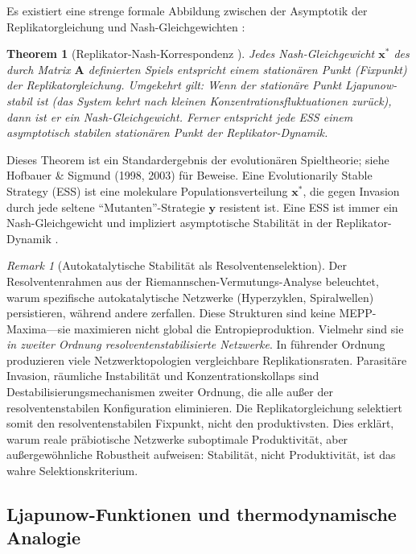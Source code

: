 \documentclass[12pt,a4paper]{article}
\newtheorem{theorem}{Theorem}
\theoremstyle{remark}
\newtheorem{remark}{Remark}
\begin{document}
Es existiert eine strenge formale Abbildung zwischen der Asymptotik der Replikatorgleichung und Nash-Gleichgewichten \citep{ReplicatorEntropy}:

\begin{theorem}[Replikator-Nash-Korrespondenz {\citep{HofbauerSigmund2003,HofbauerSigmund1998}}]
\label{thm:replicator-nash}
Jedes Nash-Gleichgewicht $\mathbf{x}^*$ des durch Matrix $\mathbf{A}$ definierten Spiels entspricht einem station\"aren Punkt (Fixpunkt) der Replikatorgleichung. Umgekehrt gilt: Wenn der station\"are Punkt Ljapunow-stabil ist (das System kehrt nach kleinen Konzentrationsfluktuationen zur\"uck), dann ist er ein Nash-Gleichgewicht. Ferner entspricht jede ESS einem asymptotisch stabilen station\"aren Punkt der Replikator-Dynamik.
\end{theorem}

Dieses Theorem ist ein Standardergebnis der evolution\"aren Spieltheorie; siehe Hofbauer \& Sigmund (1998, 2003) f\"ur Beweise. Eine Evolutionarily Stable Strategy (ESS) ist eine molekulare Populationsverteilung $\mathbf{x}^*$, die gegen Invasion durch jede seltene ``Mutanten''-Strategie $\mathbf{y}$ resistent ist. Eine ESS ist immer ein Nash-Gleichgewicht und impliziert asymptotische Stabilit\"at in der Replikator-Dynamik \citep{HofbauerSigmund1998}.

\begin{remark}[Autokatalytische Stabilit\"at als Resolventenselektion]
\label{rem:autocatalysis-resolvent}
Der Resolventenrahmen aus der Riemannschen-Vermutungs-Analyse \citep{GeigerRH2026b} beleuchtet, warum spezifische autokatalytische Netzwerke (Hyperzyklen, Spiralwellen) persistieren, w\"ahrend andere zerfallen. Diese Strukturen sind keine MEPP-Maxima---sie maximieren nicht global die Entropieproduktion. Vielmehr sind sie \emph{in zweiter Ordnung resolventenstabilisierte Netzwerke}. In f\"uhrender Ordnung produzieren viele Netzwerktopologien vergleichbare Replikationsraten. Parasit\"are Invasion, r\"aumliche Instabilit\"at und Konzentrationskollaps sind Destabilisierungsmechanismen zweiter Ordnung, die alle au\ss{}er der resolventenstabilen Konfiguration eliminieren. Die Replikatorgleichung selektiert somit den resolventenstabilen Fixpunkt, nicht den produktivsten. Dies erkl\"art, warum reale pr\"abiotische Netzwerke suboptimale Produktivit\"at, aber au\ss{}ergew\"ohnliche Robustheit aufweisen: Stabilit\"at, nicht Produktivit\"at, ist das wahre Selektionskriterium.
\end{remark}

\subsection{Ljapunow-Funktionen und thermodynamische Analogie}
\end{document}
